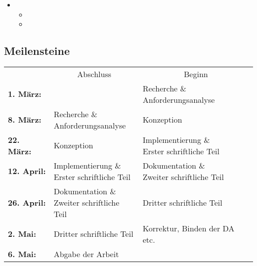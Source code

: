 \begin{itemize}
\begin{itemize}
          \begin{itemize}
            \item {}
            \item {}
          \end{itemize}
        \item {}
          \begin{itemize}
            \item {}
            \item {}
          \end{itemize}
      \end{itemize}
  \end{itemize}

  \subsection{Meilensteine}
  \label{ssec:meilensteine}
    \begin{table}[H]
      \begin{tabularx}{\textwidth}{lXX}
        {}
          & \multicolumn{1}{c}{Abschluss}
            & \multicolumn{1}{c}{Beginn}\\
        \cline{2-3}
        \textbf{1. März:}
          & {}
            & \specialcell[t]{Recherche \&\\Anforderungsanalyse}\\
        \textbf{8. März:}
          & \specialcell[t]{Recherche \&\\Anforderungsanalyse}
            & Konzeption\\
        \textbf{22. März:}
          & Konzeption
            & \specialcell[t]{Implementierung \&\\Erster schriftliche Teil}\\
        \textbf{12. April:}
          & \specialcell[t]{Implementierung \&\\Erster schriftliche Teil}
            & \specialcell[t]{Dokumentation \&\\Zweiter schriftliche Teil}\\
        \textbf{26. April:}
          & \specialcell[t]{Dokumentation \&\\Zweiter schriftliche Teil}
            & Dritter schriftliche Teil\\
        \textbf{2. Mai:}
          & Dritter schriftliche Teil
            & Korrektur, Binden der DA etc.\\
        \textbf{6. Mai:}
          & Abgabe der Arbeit
            &\\
      \end{tabularx}
    \end{table}

